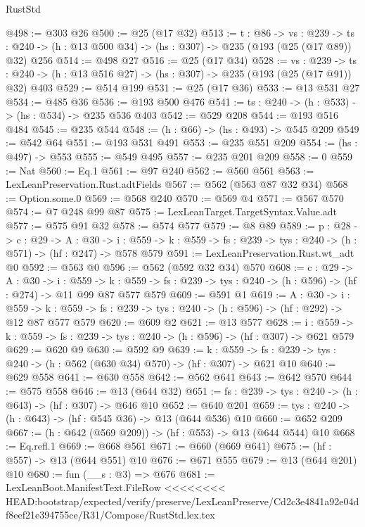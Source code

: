 \begin{lexlean}{RustStd}
\begin{coremodule}
{\begin{coremodule}
{{{{@498 := @303 @26
@500 := @25 (@17 @32)
@513 := {t : @86} ->
  {vs : @239} ->
  {ts : @240} -> (h : @13 @500 @34) -> (hs : @307) -> @235 (@193 (@25 (@17 @89)) @32) @256
@514 := @498 @27
@516 := @25 (@17 @34)
@528 := {vs : @239} ->
  {ts : @240} -> (h : @13 @516 @27) -> (hs : @307) -> @235 (@193 (@25 (@17 @91)) @32) @403
@529 := @514 @199
@531 := @25 (@17 @36)
@533 := @13 @531 @27
@534 := @485 @36
@536 := @193 @500 @476
@541 := {ts : @240} -> (h : @533) -> (hs : @534) -> @235 @536 @403
@542 := @529 @208
@544 := @193 @516 @484
@545 := @235 @544
@548 := (h : @66) -> (hs : @493) -> @545 @209
@549 := @542 @64
@551 := @193 @531 @491
@553 := @235 @551 @209
@554 := (hs : @497) -> @553
@555 := @549 @495
@557 := @235 @201 @209
@558 := 0
@559 := Nat
@560 := Eq.{1}
@561 := @97 @240
@562 := @560 @561
@563 := LexLeanPreservation.Rust.adtFields
@567 := @562 (@563 @87 @32 @34)
@568 := Option.some.{0}
@569 := @568 @240
@570 := @569 @4
@571 := @567 @570
@574 := @7 @248 @99 @87
@575 := LexLeanTarget.TargetSyntax.Value.adt
@577 := @575 @91 @32
@578 := @574 @577
@579 := @8 @89
@589 := {p : @28} ->
  {c : @29} ->
  {A : @30} ->
  {i : @559} -> {k : @559} -> {fs : @239} -> {tys : @240} -> (h : @571) -> (hf : @247) -> @578 @579
@591 := LexLeanPreservation.Rust.wt_adt @0
@592 := @563 @0
@596 := @562 (@592 @32 @34) @570
@608 := {c : @29} ->
  {A : @30} ->
  {i : @559} ->
  {k : @559} -> {fs : @239} -> {tys : @240} -> (h : @596) -> (hf : @274) -> @11 @99 @87 @577 @579
@609 := @591 @1
@619 := {A : @30} ->
  {i : @559} ->
  {k : @559} -> {fs : @239} -> {tys : @240} -> (h : @596) -> (hf : @292) -> @12 @87 @577 @579
@620 := @609 @2
@621 := @13 @577
@628 := {i : @559} ->
  {k : @559} -> {fs : @239} -> {tys : @240} -> (h : @596) -> (hf : @307) -> @621 @579
@629 := @620 @9
@630 := @592 @9
@639 := {k : @559} ->
  {fs : @239} -> {tys : @240} -> (h : @562 (@630 @34) @570) -> (hf : @307) -> @621 @10
@640 := @629 @558
@641 := @630 @558
@642 := @562 @641
@643 := @642 @570
@644 := @575 @558
@646 := @13 (@644 @32)
@651 := {fs : @239} -> {tys : @240} -> (h : @643) -> (hf : @307) -> @646 @10
@652 := @640 @201
@659 := {tys : @240} -> (h : @643) -> (hf : @545 @36) -> @13 (@644 @536) @10
@660 := @652 @209
@667 := (h : @642 (@569 @209)) -> (hf : @553) -> @13 (@644 @544) @10
@668 := Eq.refl.{1}
@669 := @668 @561
@671 := @660 (@669 @641)
@675 := (hf : @557) -> @13 (@644 @551) @10
@676 := @671 @555
@679 := @13 (@644 @201) @10
@680 := fun (__s : @3) => @676
@681 := LexLeanBoot.ManifestText.FileRow
<<<<<<<< HEAD:bootstrap/expected/verify/preserve/LexLeanPreserve/Cd2c3e4841a92e04df8eef21e394755ce/R31/Compose/RustStd.lex.tex
}}}}
\end{coremodule}}
\end{coremodule}
\end{lexlean}
